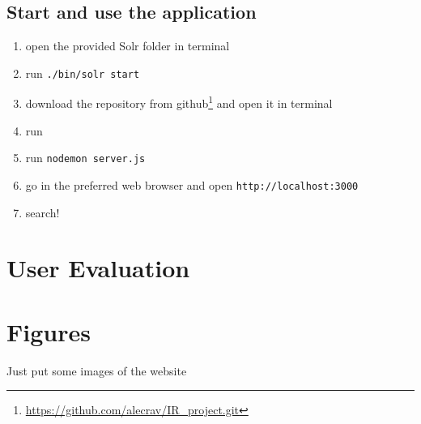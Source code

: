 \documentclass{article}
\begin{document}
\subsection{Start and use the application}
\begin{enumerate}
    \item open the provided Solr folder in terminal
    \item run \texttt{./bin/solr start}
    \item download the repository from github\footnote{\url{https://github.com/alecrav/IR_project.git}} and open it in terminal
    \item run 
    \item run \texttt{nodemon server.js}
    \item go in the preferred web browser and open \texttt{http://localhost:3000}
    \item search!
\end{enumerate}
\section{User Evaluation}

\section{Figures}
Just put some images of the website
\end{document}
